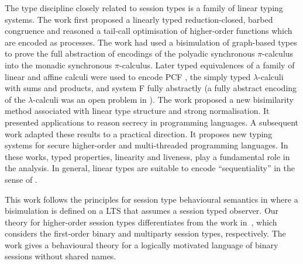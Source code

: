 The type discipline closely related
to session types is a family of linear typing systems. The
work \cite{LinearPi} first proposed a linearly typed reduction-closed, barbed congruence and 
reasoned a tail-call optimisation of higher-order functions which are
encoded 
as processes. 
The work \cite{Yoshida96} had
used a bisimulation of graph-based types to prove the full abstraction
of encodings of the polyadic synchronous $\pi$-calculus into the
monadic synchronous $\pi$-calculus. 
Later typed equivalences of a
family of linear and affine calculi \cite{BHY,YBH04,BergerHY05} 
were used to encode 
PCF \cite{Plotkin1977223,Milner19771}, the simply typed $\lambda$-calculi with sums and products, and system F \cite{GirardJY:protyp}
fully abstractly (a fully abstract encoding of the $\lambda$-calculi 
was an open problem in \cite{MilnerR:funp}).  
The work \cite{YHB02} proposed a new bisimilarity
method associated with linear type structure and strong
normalisation. It presented applications to reason secrecy in
programming languages. A subsequent work \cite{HY02} adapted these results
to a practical direction. It proposes new typing
systems for secure higher-order and multi-threaded programming 
languages. 
In these works, typed properties, linearity and liveness, 
play a fundamental role in the analysis. In general, linear types 
are suitable to encode ``sequentiality'' in the sense of 
\cite{HylandJME:fulapi,AbramskyS:fulap}.

This work follows the principles 
for
session type behavioural semantics in 
\cite{KYHH2015,KY2015,DBLP:journals/iandc/PerezCPT14}
where a bisimulation is defined on a LTS 
that assumes a session typed
observer.
Our theory for higher-order session types 
differentiates from 
the work in~\cite{KYHH2015,KY2015}, which 
considers the first-order
binary and multiparty session types, respectively.
The work \cite{DBLP:journals/iandc/PerezCPT14} gives a behavioural theory 
for a 
logically motivated
language of binary sessions 
without shared names.

